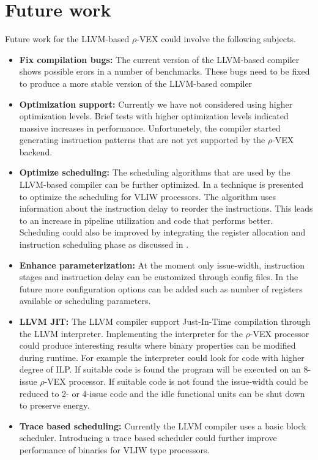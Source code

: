 \section{Future work}
Future work for the LLVM-based $\rho$-VEX could involve the following subjects.

\begin{itemize}
	\item \textbf{Fix compilation bugs:}  The current version of the LLVM-based compiler shows possible erors in a number of benchmarks. These bugs need to be fixed to produce a more stable version of the LLVM-based compiler

	\item \textbf{Optimization support:} Currently we have not considered using higher optimization levels. Brief tests with higher optimization levels indicated massive increases in performance. Unfortunetely, the compiler started generating instruction patterns that are not yet supported by the $\rho$-VEX backend.

	\item \textbf{Optimize scheduling:} The scheduling algorithms that are used by the LLVM-based compiler can be further optimized. In \cite{Vahedi:2013mz} a technique is presented to optimize the scheduling for VLIW processors. The algorithm uses information about the instruction delay to reorder the instructions. This leads to an increase in pipeline utilization and code that performs better. Scheduling could also be improved by integrating the register allocation and instruction scheduling phase as discussed in \cite{Bradlee:1991:IRA:106973.106986}. 

	\item \textbf{Enhance parameterization:} At the moment only issue-width, instruction stages and instruction delay can be customized through config files. In the future more configuration options can be added such as number of registers available or scheduling parameters.

	\item \textbf{LLVM JIT:} The LLVM compiler support Just-In-Time compilation through the LLVM interpreter. Implementing the interpreter for the $\rho$-VEX processor could produce interesting results where binary properties can be modified during runtime. For example the interpreter could look for code with higher degree of ILP. If suitable code is found the program will be executed on an 8-issue $\rho$-VEX processor. If suitable code is not found the issue-width could be reduced to 2- or 4-issue code and the idle functional units can be shut down to preserve energy.

	\item \textbf{Trace based scheduling:} Currently the LLVM compiler uses a basic block scheduler. Introducing a trace based scheduler could further improve performance of binaries for VLIW type processors.

\end{itemize}

\acresetall